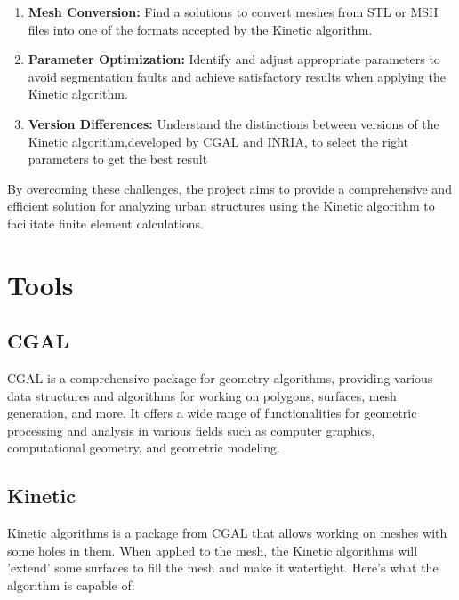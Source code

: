 \documentclass{article}
\begin{document}
\begin{enumerate}
    \item \textbf{Mesh Conversion:} Find a solutions to convert meshes 
    from STL or MSH files into one of the formats accepted by the Kinetic algorithm.
    
    \item \textbf{Parameter Optimization:} Identify and adjust appropriate 
    parameters to avoid segmentation faults and achieve satisfactory results 
    when applying the Kinetic algorithm.
    
    \item \textbf{Version Differences:} Understand the distinctions between 
    versions of the Kinetic algorithm,developed by CGAL and INRIA, to select 
    the right parameters to get the best result
\end{enumerate}

By overcoming these challenges, the project aims to provide a 
comprehensive and efficient solution for analyzing urban structures 
using the Kinetic algorithm to facilitate finite element calculations.\newline

\section{Tools}
\subsection{CGAL}
CGAL is a comprehensive package for geometry algorithms, providing various data structures and algorithms for working on polygons, surfaces, mesh generation, and more.
It offers a wide range of functionalities for geometric processing and analysis in various fields such as computer graphics, computational geometry, and geometric modeling.
\subsection{Kinetic}

Kinetic algorithms is a package from CGAL that allows working on meshes with some holes in them. When applied to the mesh, the Kinetic algorithms will 'extend' some surfaces to fill the mesh and make it watertight. 
Here's what the algorithm is capable of:
\end{document}
